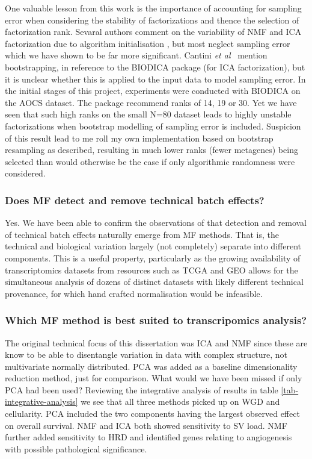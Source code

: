\documentclass[tikz, 12pt,a4paper,oneside,fleqn]{article}
\newcommand{\etal}{{\em et al\/}}
\begin{document}
One valuable lesson from this work is the importance of accounting for sampling error  when considering the stability of factorizations and thence the selection of factorization rank.    Sevaral authors comment on the variability of NMF and ICA factorization due to algorithm initialisation \cite{Kairov2017,Sompairac2019,WayGregory2019}, but most neglect sampling error which we have shown to be far more significant.   Cantini \etal\ \cite{Cantini2019a} mention bootstrapping, in reference to the BIODICA package (for ICA factorization), but it is unclear whether this is applied to the input data to model sampling error.  In the initial stages of this project, experiments were conducted with BIODICA on the AOCS dataset.   The package recommend ranks of 14, 19 or 30.  Yet we have seen that such high ranks on the small N=80 dataset leads to highly unstable factorizations when bootstrap modelling of sampling error is included.  Suspicion of this result lead to me roll my own implementation based on bootstrap resampling as described, resulting in much lower ranks (fewer metagenes) being selected than would otherwise be the case if only algorithmic randomness were considered.

\subsubsection*{Does MF detect and remove technical batch effects?}

Yes. We have been able to confirm the observations of \cite{Zhou2018a,Renard2016,Meng2016} that detection and removal of technical  batch effects naturally emerge from MF methods.  That is, the technical and biological variation largely (not completely) separate into different components.  This is a useful property, particularly as the growing availability of transcriptomics datasets from resources such as TCGA and GEO allows for the simultaneous analysis of dozens of distinct datasets with likely different technical provenance, for which hand crafted normalisation would be infeasible.

\subsubsection*{Which MF method is best suited to transcripomics analysis?}

The original technical focus of this dissertation was ICA and NMF since these are know to be able to disentangle variation in data with complex structure, not multivariate normally distributed.  PCA was added as a baseline dimensionality reduction method, just for comparison.   What would we have been missed if only PCA had been used?  Reviewing the integrative analysis of results in table \ref{tab-integrative-analysis} we see that all three methods picked up on WGD and cellularity.  PCA included the two components having the largest observed effect on overall survival.  NMF and ICA both showed sensitivity to SV load.  NMF further added sensitivity to HRD and identified genes relating to angiogenesis with possible pathological significance.
\end{document}
